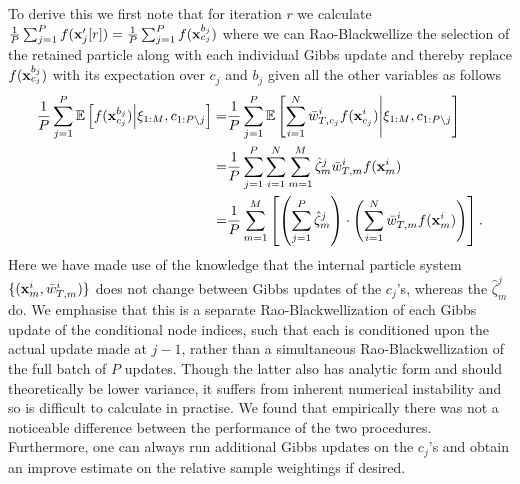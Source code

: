 To derive this we first note that for iteration $r$ we calculate
$\frac{1}{P}\sum_{j=1}^P f(\mathbf{x}_j'[r]) = \frac{1}{P}\sum_{j=1}^P f(\mathbf{x}_{c_j}^{b_j})$
where we can Rao-Blackwellize the selection of the retained particle along with each individual Gibbs update
and thereby replace $f(\mathbf{x}_{c_j}^{b_j})$ with its expectation over $c_j$ and $b_j$ given all the other variables
as follows
\begin{align*}
\frac{1}{P}\sum_{j=1}^P \mathbb{E} \left[f(\mathbf{x}_{c_j}^{b_j}) \middle| \xi_{1:M}, c_{1:P\backslash j} \right] =& 
\frac{1}{P}\sum_{j=1}^P \mathbb{E} \left[\sum_{i=1}^N \bar w_{T,c_j}^i  f(\mathbf{x}_{c_j}^{i}) \middle| \xi_{1:M}, c_{1:P\backslash j} \right] \\ 
=& \frac{1}{P}\sum_{j=1}^P \sum_{i=1}^N \sum_{m=1}^M \hat \zeta_m^j \bar w_{T,m}^i  f(\mathbf{x}_{m}^{i}) \\
=& \frac{1}{P} \sum_{m=1}^M  \left[\left(\sum_{j=1}^P \hat \zeta_m^j \right) \cdot \left(\sum_{i=1}^N \bar w_{T,m}^i  f(\mathbf{x}_{m}^{i}) \right)\right].
\end{align*}
Here we have made use of the knowledge that the internal particle system $\{(\mathbf{x}_{m}^{i},\bar w_{T,m}^i)\}$ does not change between Gibbs updates of the $c_j$'s, whereas the $\hat \zeta_m^j$ do.  We emphasise that this is a separate Rao-Blackwellization of each Gibbs update of the conditional node indices, such that each is conditioned upon the actual update made at $j-1$, rather than a simultaneous Rao-Blackwellization of the full batch of $P$ updates.  Though the latter also has analytic form and should theoretically be lower variance, it suffers from inherent numerical instability and so is difficult to calculate in practise.  We found that empirically there was not a noticeable difference between the performance of the two procedures.  Furthermore, one can always run additional Gibbs updates on the $c_j$'s and obtain an improve estimate on the relative sample weightings if desired.

